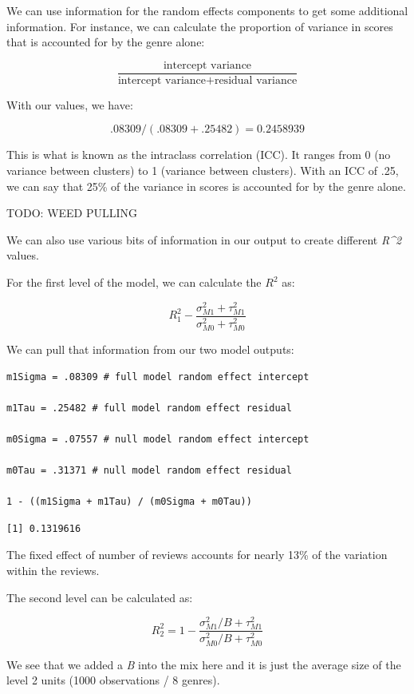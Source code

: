 \documentclass[
  letterpaper,
]{krantz}
\begin{document}
We can use information for the random effects components to get some
additional information. For instance, we can calculate the proportion of
variance in scores that is accounted for by the genre alone:

\[\frac{\text{intercept variance}}{\text{intercept variance} + \text{residual variance}}\]

With our values, we have:

\[
.08309 / (.08309 + .25482) = 0.2458939
\]

This is what is known as the intraclass correlation (ICC). It ranges
from 0 (no variance between clusters) to 1 (variance between clusters).
With an ICC of .25, we can say that 25\% of the variance in scores is
accounted for by the genre alone.

TODO: WEED PULLING

We can also use various bits of information in our output to create
different \emph{R\^{}2} values.

For the first level of the model, we can calculate the \(R^2\) as:

\[R^2_1 - \frac{\sigma^2_{M1} + \tau^2_{M1}}{\sigma^2_{M0} + \tau^2_{M0}}\]

We can pull that information from our two model outputs:

\begin{verbatim}
m1Sigma = .08309 # full model random effect intercept

m1Tau = .25482 # full model random effect residual

m0Sigma = .07557 # null model random effect intercept

m0Tau = .31371 # null model random effect residual

1 - ((m1Sigma + m1Tau) / (m0Sigma + m0Tau))
\end{verbatim}

\begin{verbatim}
[1] 0.1319616
\end{verbatim}

The fixed effect of number of reviews accounts for nearly 13\% of the
variation within the reviews.

The second level can be calculated as:

\[R^2_2 = 1 - \frac{\sigma^2_{M1} / B + \tau^2_{M1}}{\sigma^2_{M0} / B + \tau^2_{M0}}\]

We see that we added a \emph{B} into the mix here and it is just the
average size of the level 2 units (1000 observations / 8 genres).
\end{document}
